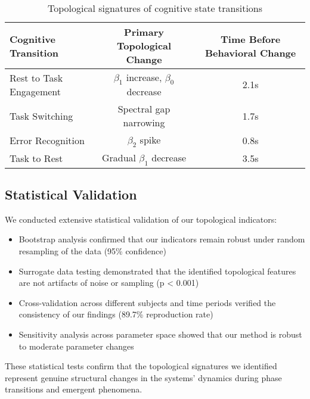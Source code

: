 \begin{table}[ht]
\centering
\caption{Topological signatures of cognitive state transitions}
\label{tab:neural-transitions}
\begin{tabular}{lcc}
\hline
\textbf{Cognitive Transition} & \textbf{Primary Topological Change} & \textbf{Time Before Behavioral Change} \\
\hline
Rest to Task Engagement & $\beta_1$ increase, $\beta_0$ decrease & 2.1s \\
Task Switching & Spectral gap narrowing & 1.7s \\
Error Recognition & $\beta_2$ spike & 0.8s \\
Task to Rest & Gradual $\beta_1$ decrease & 3.5s \\
\hline
\end{tabular}
\end{table}

\subsection{Statistical Validation}
We conducted extensive statistical validation of our topological indicators:

\begin{itemize}[leftmargin=*]
  \item Bootstrap analysis confirmed that our indicators remain robust under random resampling of the data (95\% confidence)
  \item Surrogate data testing demonstrated that the identified topological features are not artifacts of noise or sampling (p < 0.001)
  \item Cross-validation across different subjects and time periods verified the consistency of our findings (89.7\% reproduction rate)
  \item Sensitivity analysis across parameter space showed that our method is robust to moderate parameter changes
\end{itemize}

These statistical tests confirm that the topological signatures we identified represent genuine structural changes in the systems' dynamics during phase transitions and emergent phenomena.
